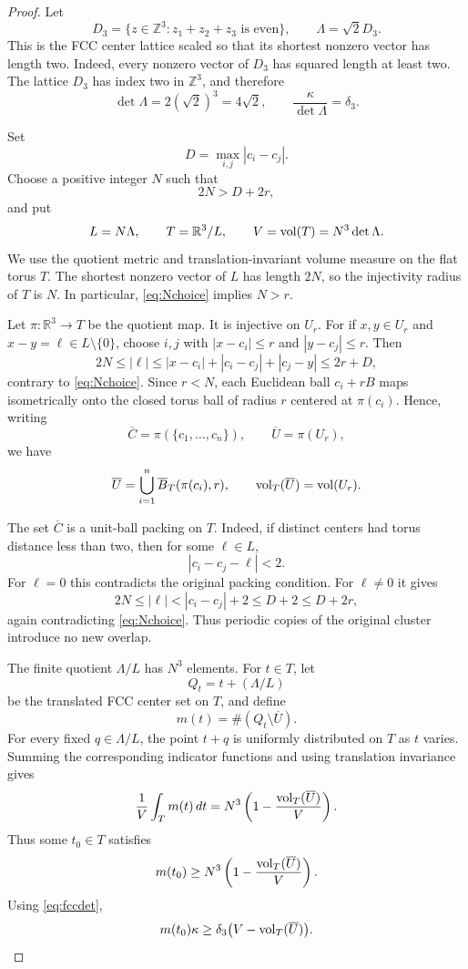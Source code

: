 \begin{proof}
Let
\[
 D_3=\{z\in\mathbb Z^3:z_1+z_2+z_3\text{ is even}\},
 \qquad
 \Lambda=\sqrt2D_3.
\]
This is the FCC center lattice scaled so that its shortest nonzero vector has
length two.  Indeed, every nonzero vector of $D_3$ has squared length at least
two.  The lattice $D_3$ has index two in $\mathbb Z^3$, and therefore
\begin{equation}\label{eq:fccdet}
 \det\Lambda=2(\sqrt2)^3=4\sqrt2,
 \qquad
 \frac{\kappa}{\det\Lambda}=\delta_3.
\end{equation}

Set
\[
 D=\max_{i,j}|c_i-c_j|.
\]
Choose a positive integer $N$ such that
\begin{equation}\label{eq:Nchoice}
 2N>D+2r,
\end{equation}
and put
\[
 L=N\Lambda,
 \qquad
 T=\mathbb R^3/L,
 \qquad
 V=\operatorname{vol}(T)=N^3\det\Lambda.
\]
We use the quotient metric and translation-invariant volume measure on the flat
torus $T$.  The shortest nonzero vector of $L$ has length $2N$, so the
injectivity radius of $T$ is $N$.  In particular, \cref{eq:Nchoice} implies
$N>r$.

Let $\pi:\mathbb R^3\to T$ be the quotient map.  It is injective on $U_r$.
For if $x,y\in U_r$ and $x-y=\ell\in L\setminus\{0\}$, choose $i,j$ with
$|x-c_i|\le r$ and $|y-c_j|\le r$.  Then
\[
 2N\le|\ell|
 \le |x-c_i|+|c_i-c_j|+|c_j-y|
 \le2r+D,
\]
contrary to \cref{eq:Nchoice}.  Since $r<N$, each Euclidean ball
$c_i+rB$ maps isometrically onto the closed torus ball of radius $r$ centered at
$\pi(c_i)$.  Hence, writing
\[
 \overline C=\pi(\{c_1,\ldots,c_n\}),
 \qquad
 \overline U=\pi(U_r),
\]
we have
\begin{equation}\label{eq:torusvolume}
 \overline U=\bigcup_{i=1}^n\overline B_T(\pi(c_i),r),
 \qquad
 \operatorname{vol}_T(\overline U)=\operatorname{vol}(U_r).
\end{equation}

The set $\overline C$ is a unit-ball packing on $T$.  Indeed, if distinct
centers had torus distance less than two, then for some $\ell\in L$,
\[
 |c_i-c_j-\ell|<2.
\]
For $\ell=0$ this contradicts the original packing condition.  For
$\ell\ne0$ it gives
\[
 2N\le|\ell|<|c_i-c_j|+2\le D+2\le D+2r,
\]
again contradicting \cref{eq:Nchoice}.  Thus periodic copies of the original
cluster introduce no new overlap.

The finite quotient $\Lambda/L$ has $N^3$ elements.  For $t\in T$, let
\[
 Q_t=t+(\Lambda/L)
\]
be the translated FCC center set on $T$, and define
\[
 m(t)=\#(Q_t\setminus\overline U).
\]
For every fixed $q\in\Lambda/L$, the point $t+q$ is uniformly distributed on
$T$ as $t$ varies.  Summing the corresponding indicator functions and using
translation invariance gives
\begin{equation}\label{eq:averagefiller}
 \frac1V\int_T m(t)\,dt
 =N^3\left(1-\frac{\operatorname{vol}_T(\overline U)}V\right).
\end{equation}
Thus some $t_0\in T$ satisfies
\[
 m(t_0)\ge
 N^3\left(1-\frac{\operatorname{vol}_T(\overline U)}V\right).
\]
Using \cref{eq:fccdet},
\begin{equation}\label{eq:fillerlower}
 m(t_0)\kappa
 \ge
 \delta_3\bigl(V-\operatorname{vol}_T(\overline U)\bigr).
\end{equation}


\end{proof}
